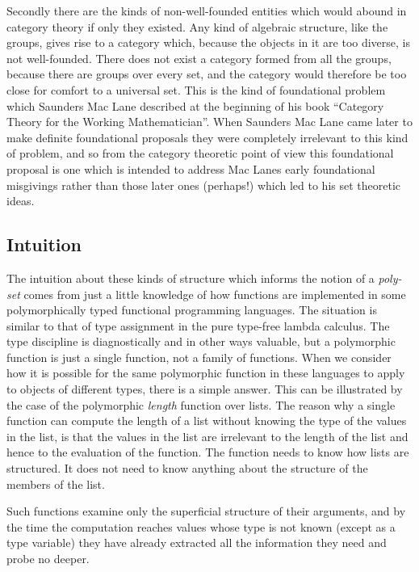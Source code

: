 \documentclass[numreferences]{rbjk}
\begin{document}
\begin{article}
Secondly there are the kinds of non-well-founded entities which would abound in category theory if only they existed.
Any kind of algebraic structure, like the groups, gives rise to a category which, because the objects in it are too diverse, is not well-founded.
There does not exist a category formed from all the groups, because there are groups over every set, and the category would therefore be too close for comfort to a universal set.
This is the kind of foundational problem which Saunders Mac Lane described at the beginning of his book ``Category Theory for the Working Mathematician''.
When Saunders Mac Lane came later to make definite foundational proposals they were completely irrelevant to this kind of problem, and so from the category theoretic point of view this foundational proposal is one which is intended to address Mac Lanes early foundational misgivings rather than those later ones (perhaps!) which led to his set theoretic ideas.

\subsection{Intuition}

The intuition about these kinds of structure which informs the notion of a \emph{poly-set} comes from just a little knowledge of how functions are implemented in some polymorphically typed functional programming languages.
The situation is similar to that of type assignment in the pure type-free lambda calculus.
The type discipline is diagnostically and in other ways valuable, but a polymorphic function is just a single function, not a family of functions.
When we consider how it is possible for the same polymorphic function in these languages to apply to objects of different types, there is a simple answer.
This can be illustrated by the case of the polymorphic \emph{length} function over lists.
The reason why a single function can compute the length of a list without knowing the type of the values in the list, is that the values in the list are irrelevant to the length of the list and hence to the evaluation of the function.
The function needs to know how lists are structured.
It does not need to know anything about the structure of the members of the list.

Such functions examine only the superficial structure of their arguments, and by the time the computation reaches values whose type is not known (except as a type variable) they have already extracted all the information they need and probe no deeper.


\end{article}
\end{document}
